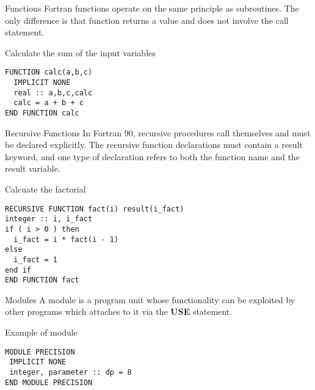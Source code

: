 \begin{frame}[fragile]{Functions}
Fortran functions operate on the same principle as subroutines.
The only difference is that function returns a value and does not
involve the call statement.

\begin{block}{Calculate the sum of the input variables}
\begin{lstlisting}
FUNCTION calc(a,b,c)
  IMPLICIT NONE
  real :: a,b,c,calc
  calc = a + b + c
END FUNCTION calc
\end{lstlisting}
\end{block}
\end{frame}


\begin{frame}[fragile]{Recursive Functions}
In Fortran 90, recursive procedures call themselves and must be declared explicitly.
The recursive function declarations must contain a result keyword, and 
one type of declaration refers to both the function name and the result variable.
\begin{block}{Calcuate the factorial}
\begin{lstlisting}
RECURSIVE FUNCTION fact(i) result(i_fact)
integer :: i, i_fact
if ( i > 0 ) then
  i_fact = i * fact(i - 1)
else
  i_fact = 1
end if
END FUNCTION fact
\end{lstlisting}
\end{block}
\end{frame}

\begin{frame}[fragile]{Modules}
A module is a program unit whose functionality can be exploited
by other programs which attaches to it via the \textbf{USE} statement.
\begin{block}{Example of module}
\begin{lstlisting}
MODULE PRECISION
 IMPLICIT NONE
 integer, parameter :: dp = 8
END MODULE PRECISION
\end{lstlisting}
\end{block}
\end{frame}
